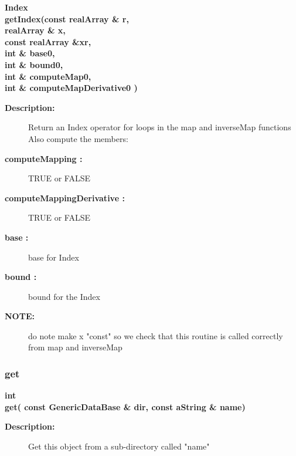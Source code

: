 \begin{flushleft} \textbf{%
Index  \\ 
\settowidth{\MappingIncludeArgIndent}{getIndex(}%
getIndex(const realArray \& r, \\ 
\hspace{\MappingIncludeArgIndent}realArray \& x, \\ 
\hspace{\MappingIncludeArgIndent}const realArray \&xr,\\ 
\hspace{\MappingIncludeArgIndent}int \& base0, \\ 
\hspace{\MappingIncludeArgIndent}int \& bound0, \\ 
\hspace{\MappingIncludeArgIndent}int \& computeMap0, \\ 
\hspace{\MappingIncludeArgIndent}int \& computeMapDerivative0 )
}\end{flushleft}
\begin{description}
\item[{\bf Description:}] 
    Return an Index operator for loops in the map and inverseMap functions
  Also compute the members:
\item[{\bf computeMapping :}]  TRUE or FALSE
\item[{\bf computeMappingDerivative :}]  TRUE or FALSE
\item[{\bf base :}]  base for Index
\item[{\bf bound :}]  bound for the Index

\item[{\bf NOTE:}]  do note make x "const" so we check that this routine is called
       correctly from map and inverseMap
\end{description}
\subsubsection{get}
 
\begin{flushleft} \textbf{%
int  \\ 
\settowidth{\MappingIncludeArgIndent}{get(}%
get( const GenericDataBase \& dir, const aString \& name)
}\end{flushleft}
\begin{description}
\item[{\bf Description:}] 
    Get this object from a sub-directory called "name"
\end{description}
